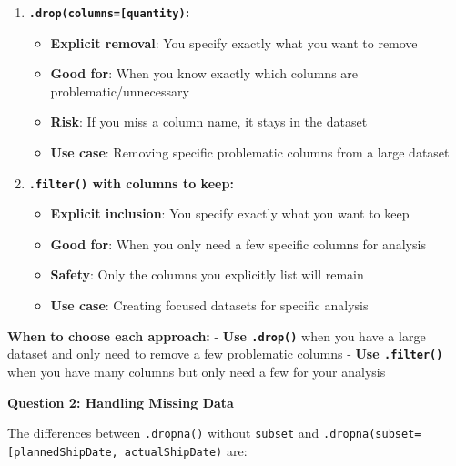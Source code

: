 \documentclass[
  letterpaper,
  DIV=11,
  numbers=noendperiod]{scrartcl}
\providecommand{\tightlist}{%
  \setlength{\itemsep}{0pt}\setlength{\parskip}{0pt}}
\begin{document}
\begin{enumerate}
\def\labelenumi{\arabic{enumi}.}
\tightlist
\item
  \textbf{\texttt{.drop(columns={[}\textquotesingle{}quantity\textquotesingle{}{]})}:}

  \begin{itemize}
  \tightlist
  \item
    \textbf{Explicit removal}: You specify exactly what you want to
    remove
  \item
    \textbf{Good for}: When you know exactly which columns are
    problematic/unnecessary
  \item
    \textbf{Risk}: If you miss a column name, it stays in the dataset
  \item
    \textbf{Use case}: Removing specific problematic columns from a
    large dataset
  \end{itemize}
\item
  \textbf{\texttt{.filter()} with columns to keep:}

  \begin{itemize}
  \tightlist
  \item
    \textbf{Explicit inclusion}: You specify exactly what you want to
    keep
  \item
    \textbf{Good for}: When you only need a few specific columns for
    analysis
  \item
    \textbf{Safety}: Only the columns you explicitly list will remain
  \item
    \textbf{Use case}: Creating focused datasets for specific analysis
  \end{itemize}
\end{enumerate}

\textbf{When to choose each approach:} - \textbf{Use \texttt{.drop()}}
when you have a large dataset and only need to remove a few problematic
columns - \textbf{Use \texttt{.filter()}} when you have many columns but
only need a few for your analysis

\textbf{Question 2: Handling Missing Data}

The differences between \texttt{.dropna()} without \texttt{subset} and
\texttt{.dropna(subset={[}\textquotesingle{}plannedShipDate\textquotesingle{},\ \textquotesingle{}actualShipDate\textquotesingle{}{]})}
are:
\end{document}
